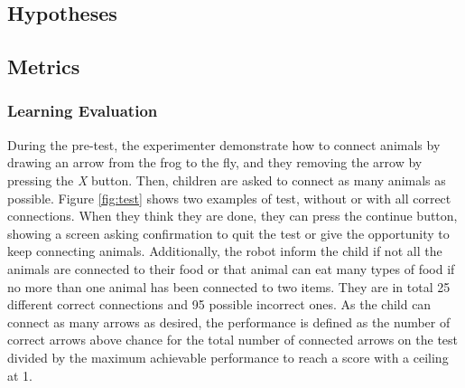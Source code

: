 \subsection{Hypotheses}

\subsection{Metrics}
\subsubsection{Learning Evaluation}
During the pre-test, the experimenter demonstrate how to connect animals by drawing an arrow from the frog to the fly, and they removing the arrow by pressing the \textit{X} button. Then, children are asked to connect as many animals as possible. Figure \ref{fig:test} shows two examples of test, without or with all correct connections. When they think they are done, they can press the continue button, showing a screen asking confirmation to quit the test or give the opportunity to keep connecting animals. Additionally, the robot inform the child if not all the animals are connected to their food or that animal can eat many types of food if no more than one animal has been connected to two items. They are in total 25 different correct connections and 95 possible incorrect ones. As the child can connect as many arrows as desired, the performance is defined as the number of correct arrows above chance for the total number of connected arrows on the test divided by the maximum achievable performance to reach a score with a ceiling at 1.

